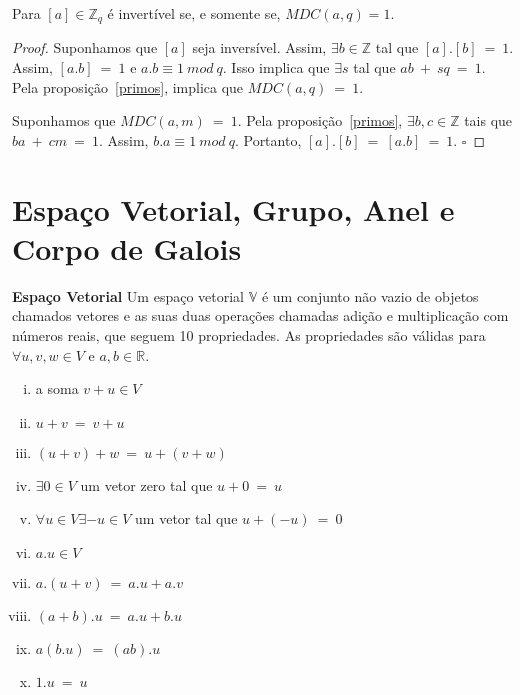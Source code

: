 \begin{proposition} \label{invertivel} Para  $[a] \in \mathbb{Z}_q$  é invertível se, e somente se, $MDC(a,q)=1$.
\end{proposition}

\begin{proof}
Suponhamos que $[a]$ seja inversível. Assim, $\exists b \in \mathbb{Z}$ tal que $[a].[b]\ =\ 1$. Assim, $[a.b]\ =\ 1$ e $a.b \equiv 1\ mod\ q$. Isso implica que $\exists s$ tal que $ab\ +\ sq\ =\ 1$. Pela proposição~\ref{primos}, implica que $MDC(a,q)\ =\ 1$.

Suponhamos que $MDC(a,m)\ =\ 1$. Pela proposição~\ref{primos}, $\exists b, c \in \mathbb{Z}$ tais que $ba\ +\ cm\ =\ 1$. Assim, $b.a \equiv 1\ mod\ q$. Portanto, $[a].[b]\ =\ [a.b]\ =\ 1$.
$\square$
\end{proof}

\section{Espaço Vetorial, Grupo, Anel e Corpo de Galois}

\begin{definition} {\bf Espaço Vetorial} \label{EspVet}  Um espaço vetorial $\mathbb{V}$ é um conjunto não vazio de objetos chamados vetores e as suas duas operações chamadas adição e multiplicação com números reais, que seguem 10 propriedades. As propriedades são válidas para $\forall u, v, w \in V$ e $a, b \in \mathbb{R}$.
   \begin{enumerate}[(i)]
      \item a soma $v + u \in V$ 
      \item $u + v\ =\ v + u$
      \item $(u + v) + w\ =\  u + (v + w)$
      \item $\exists 0 \in V$ um vetor zero tal que $u + 0\ =\ u$
      \item $\forall u \in V \exists -u \in V$ um vetor tal que $u + (-u)\ =\ 0$
      \item $a.u \in V$
      \item $a.(u + v)\ =\ a.u + a.v$
      \item $(a+b).u\ =\ a.u + b.u$
      \item $a(b.u)\ =\ (ab).u$
      \item $1.u\ =\ u$
   \end{enumerate}
\end{definition}

